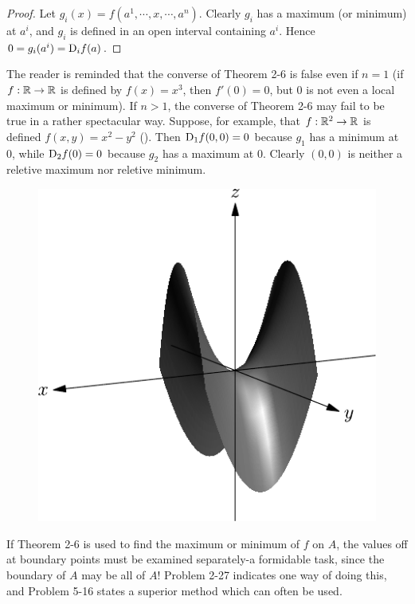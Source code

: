 \begin{proof}
  Let $g_i(x) = f(a^1, \cdots, x, \cdots, a^n)$. Clearly $g_i$ has a maximum (or minimum)
  at $a^i$, and $g_i$ is defined in an open interval containing 
  $a^i$. Hence $0 = g_i(a^i) = \mathrm{D}_if(a)$.
\end{proof}

The reader is reminded that the converse of Theorem 2-6
is false even if $n=1$ (if $f:\mathbb{R}\to \mathbb{R}$ is defined by $f(x) = x^3$, then $f'(0) = 0$, but 
0 is not even a local maximum or minimum). If $n>1$, the converse of Theorem 2-6 may fail 
to be true in a rather spectacular way. Suppose, for example, that $f:\mathbb{R}^2\to \mathbb{R}$ is defined 
$f(x, y) = x^2-y^2$ (). Then $\mathrm{D}_1f(0, 0) = 0$ because $g_1$ 
has a minimum at 0, while $\mathrm{D}_2f(0) = 0$ because $g_2$ has a maximum at 0. 
Clearly $(0, 0)$ is neither a reletive maximum nor reletive minimum.

\begin{figure}[!htb]
    \centering
    \includegraphics[width=.75\linewidth]{./pics/Fig2-2.pdf}
    \caption{}
    \label{Fig 2-2}
\end{figure}

If Theorem 2-6 is used to find the maximum or minimum of
$f$ on $A$, the values off at boundary points must be examined
separately-a formidable task, since the boundary of $A$ may
be all of $A$! Problem 2-27 indicates one way of doing this,
and Problem 5-16 states a superior method which can often
be used.

